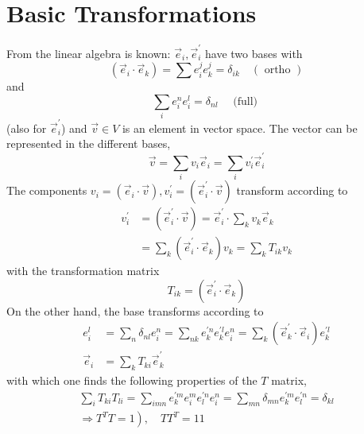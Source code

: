 \section{Basic Transformations}
From the linear algebra is known: $\vec{e}_i,\vec{e}^{\prime}_i$ have two bases with
\begin{equation}
    \left(\vec{e}_{i} \cdot \vec{e}_{k}\right)=\sum e_{i}^{j} e_{k}^{j}=\delta_{i k} \quad(\text { ortho })
    \end{equation}
and
\begin{equation}
    \sum_{i} e_{i}^{n} e_{i}^{l}=\delta_{n l} \quad \text { (full) }
    \end{equation}
(also for $\vec{e}^{\prime}_i$) and $\vec{v}\in V$ is an element in vector space. The vector can be represented in the different bases,
\begin{equation}
    \vec{v}=\sum_{i} v_{i} \vec{e}_{i}=\sum_{i} v_{i}^{\prime} \vec{e}_{i}^{\prime}
    \end{equation}
The components $v_i=(\vec{e}_i\cdot\vec{v}),v^{\prime}_i=(\vec{e}^{\prime}_i\cdot \vec{v})$ transform according to
\begin{equation}
\begin{aligned} v_{i}^{\prime} &=\left(\vec{e}_{i}^{\prime} \cdot \vec{v}\right)=\vec{e}_{i}^{\prime} \cdot \sum_{k} v_{k} \vec{e}_{k} \\ &=\sum_{k}\left(\vec{e}_{i}^{\prime} \cdot \vec{e}_{k}\right) v_{k}=\sum_{k} T_{i k} v_{k} \end{aligned}
\end{equation}
with the transformation matrix
\begin{equation}
    T_{i k}=\left(\vec{e}_{i}^{\prime} \cdot \vec{e}_{k}\right)
    \end{equation}
On the other hand, the base transforms according to
\begin{equation}
\begin{aligned} e_{i}^{l} &=\sum_{n} \delta_{n l} e_{i}^{n}=\sum_{n k} e_{k}^{\prime n} e_{k}^{\prime l} e_{i}^{n}=\sum_{k}\left(\vec{e}_{k}^{\prime} \cdot \vec{e}_{i}\right) e_{k}^{\prime l} \\ \vec{e}_{i} &=\sum_{k} T_{k i} \vec{e}_{k}^{\prime} \end{aligned}
\end{equation}
with which one finds the following properties of the $T$ matrix,
\begin{equation}
\begin{array}{l}{\sum_{i} T_{k i} T_{l i}=\sum_{i m n} e_{k}^{\prime m} e_{i}^{m} e_{l}^{\prime n} e_{i}^{n}=\sum_{m n} \delta_{m n} e_{k}^{\prime m} e_{l}^{\prime n}=\delta_{k l}} \\ {\left.\Rightarrow T^{T} T=1\right), \quad T T^{T}=11}\end{array}
\end{equation}

